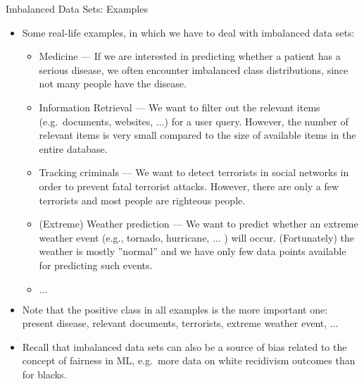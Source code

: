 \begin{vbframe}{Imbalanced Data Sets: Examples}
%	
\footnotesize{
	\begin{itemize}
%		
		\item Some real-life examples, in which we have to deal with imbalanced data sets:
%		
		\begin{itemize}
			\scriptsize
			\item Medicine --- If we are interested in predicting whether a patient has a serious disease, we often encounter imbalanced class distributions, since not many people have the disease.
%			
			\item Information Retrieval --- We want to filter out the relevant items (e.g.\ documents, websites, $\ldots$) for a user query. However, the number of relevant items is very small compared to the size of available items in the entire database.  
%			
			\item Tracking criminals --- We want to detect terrorists in social networks in order to prevent fatal terrorist attacks. However, there are only a few terrorists and most people are righteous people. 
%			
			\item (Extreme) Weather prediction ---  We want to predict whether an extreme weather event (e.g., tornado, hurricane, $\ldots$ ) will occur. (Fortunately) the weather is mostly ''normal'' and we have only few data points available for predicting such events.
%			
			\item $\ldots$
		\end{itemize}
%	 
	\item Note that the positive class in all examples is the more important one: present disease, relevant documents, terrorists, extreme weather event, $\ldots$
%
	\item Recall that imbalanced data sets can also be a source of bias related to the concept of fairness in ML, e.g.\ more data on white recidivism outcomes than for blacks.
%
	\end{itemize}}
%
\end{vbframe}

